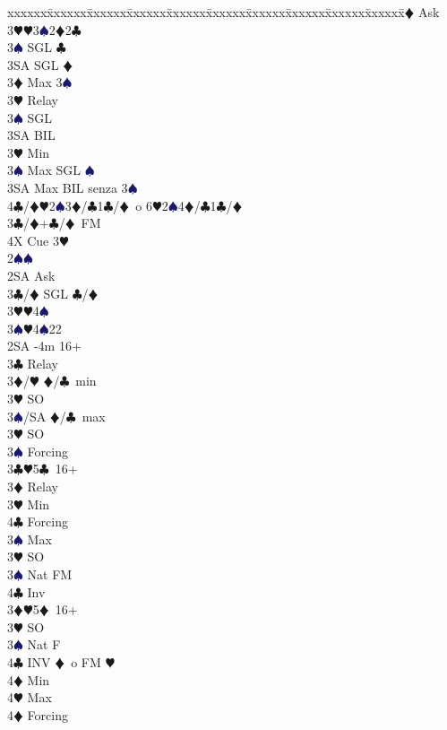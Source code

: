 \documentclass[a4paper,italian]{article}
\newcommand{\BC}{\textcolor{OliveGreen}{$\clubsuit$}}
\newcommand{\BD}{\textcolor{RedOrange}{$\vardiamondsuit$}}
\newcommand{\BH}{\textcolor{Red2}{$\varheartsuit${}}}
\newcommand{\BS}{\textcolor{MidnightBlue}{$\spadesuit${}}}
\newenvironment{bidtable}
{\begin{tabbing}

    xxxxxx\=xxxxxx\=xxxxxx\=xxxxxx\=xxxxxx\=xxxxxx\=xxxxxx\=xxxxxx\=xxxxxx\=xxxxxx\=\kill}
{\end{tabbing} }%
\begin{document}
\begin{multicols*}{2}
\begin{bidtable}
        3\BD \> Ask\+\\
        3\BH {}\BH3\BS2\BD2\BC\\
        3\BS \> SGL \BC\\
        3SA \> SGL \BD\-\-\\
        3\BD \> Max 3\BS\+\\
        3\BH \> Relay \+\\
        3\BS \> SGL\\
        3SA \> BIL\-\-\\
        3\BH \> Min\\
        3\BS \> Max SGL \BS \\
        3SA \> Max BIL senza 3\BS\\
        4\BC/\BD {}\BH2\BS3\BD/\BC1\BC/\BD\ o 6\BH2\BS4\BD/\BC1\BC/\BD\-\\
        3\BC/\BD {}+\BC /\BD\ FM\\
        4X \> Cue 3\BH \-\\
        2\BS {}\BS \+\\
        2SA \> Ask\+\\
        3\BC/\BD \> SGL \BC /\BD \\
        3\BH {}\BH 4\BS \\
        3\BS {}\BH 4\BS 22\-\-\\
        2SA -4m 16+\+\\
        3\BC \> Relay\+\\
        3\BD/\BH \> \BD /\BC\ min\+\\
        3\BH \> SO\-\\
        3\BS/SA \> \BD /\BC\ max\-\\
        3\BH \> SO\\
        3\BS \> Forcing\-\\
        3\BC {}\BH 5\BC\ 16+\+\\
        3\BD \> Relay\+\\
        3\BH \> Min\+\\
        4\BC \> Forcing\-\\
        3\BS \> Max\-\\
        3\BH \> SO\\
        3\BS \> Nat FM\\
        4\BC \> Inv\-\\
        3\BD {}\BH 5\BD\ 16+\+\\
        3\BH \> SO\\
        3\BS \> Nat F\\
        4\BC \> INV \BD\ o FM \BH \+\\
        4\BD \> Min\\
        4\BH \> Max\-\\
        4\BD \> Forcing\-\-
    \end{bidtable}


\end{multicols*}
\end{document}
